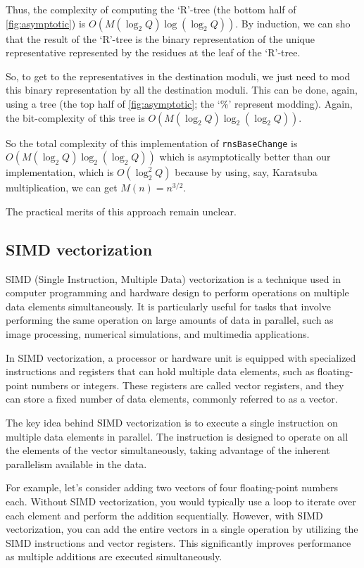 Thus, the complexity of computing the `R'-tree (the bottom half of
\autoref{fig:asymptotic}) is $O(M(\log_2Q)\log(\log_2Q))$. By induction, we can
sho that the result of the `R'-tree is the binary representation of the unique
representative represented by the residues at the leaf of the `R'-tree.

So, to get to the representatives in the destination moduli, we just need to
mod this binary representation by all the destination moduli. This can be done,
again, using a tree (the top half of \autoref{fig:asymptotic}; the `\%'
represent modding). Again, the bit-complexity of this tree is
$O(M(\log_2Q)\log_2(\log_2Q))$.

So the total complexity of this implementation of \verb!rnsBaseChange! is
$O(M(\log_2Q)\log_2(\log_2Q))$ which is asymptotically better than our
implementation, which is $O(\log_2^2Q)$ because by using, say, Karatsuba
multiplication, we can get $M(n) = n^{3/2}$.

The practical merits of this approach remain unclear.

\subsection{SIMD vectorization}

SIMD (Single Instruction, Multiple Data) vectorization is a technique used in
computer programming and hardware design to perform operations on multiple data
elements simultaneously. It is particularly useful for tasks that involve
performing the same operation on large amounts of data in parallel, such as
image processing, numerical simulations, and multimedia applications.

In SIMD vectorization, a processor or hardware unit is equipped with
specialized instructions and registers that can hold multiple data elements,
such as floating-point numbers or integers. These registers are called vector
registers, and they can store a fixed number of data elements, commonly
referred to as a vector.

The key idea behind SIMD vectorization is to execute a single instruction on
multiple data elements in parallel. The instruction is designed to operate on
all the elements of the vector simultaneously, taking advantage of the inherent
parallelism available in the data.

For example, let's consider adding two vectors of four floating-point numbers
each. Without SIMD vectorization, you would typically use a loop to iterate
over each element and perform the addition sequentially. However, with SIMD
vectorization, you can add the entire vectors in a single operation by
utilizing the SIMD instructions and vector registers. This significantly
improves performance as multiple additions are executed simultaneously.

